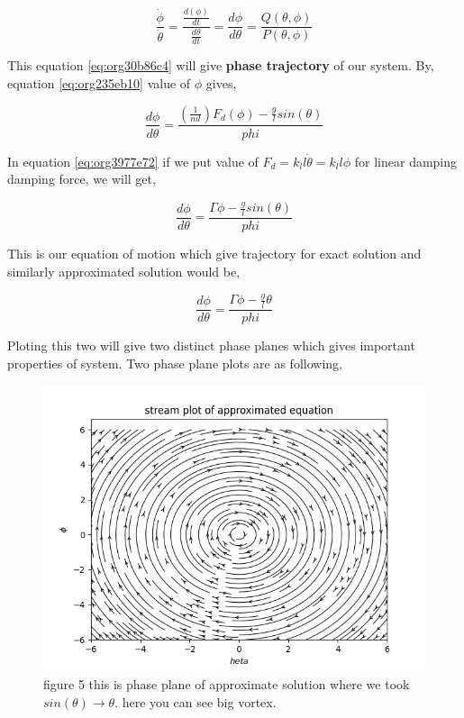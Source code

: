\documentclass[11pt,a4paper]{article}
\begin{document}
\begin{equation}
\label{eq:org30b86c4}
\frac{\dot{\phi}}{\dot{\theta}}= \frac{\frac{d(\phi)}{dt}}{\frac{d{\theta}}{dt}} = \frac{d\phi}{d\theta}= \frac{Q(\theta,\phi)}{P(\theta,\phi)}
\end{equation}

This equation \ref{eq:org30b86c4} will give \textbf{phase trajectory} of our system. By, equation \ref{eq:org235eb10} value of \(\phi\) gives,

\begin{equation}
\label{eq:org3977e72}
\frac{d\phi}{d\theta}=\frac{(\frac{1}{ml})F_{d}(\phi)-\frac{g}{l}sin(\theta)}{phi}
\end{equation}

In equation \ref{eq:org3977e72} if we put value of \(F_{d} = k_{l}l\dot{\theta} = k_{l}l\phi\) for linear damping damping force, we will get,

\begin{equation}
\label{eq:orgf0d9fc2}
\frac{d\phi}{d\theta}=\frac{\Gamma\phi-\frac{g}{l}sin(\theta)}{phi}
\end{equation}

This is our equation of motion which give trajectory for exact solution and similarly approximated solution would be,

\begin{equation}
\label{eq:orgb4885f9}
\frac{d\phi}{d\theta}=\frac{\Gamma\phi-\frac{g}{l}\theta}{phi}
\end{equation}

Ploting this two will give two distinct phase planes which gives important properties of system. Two phase plane plots are as following, 


\begin{figure}[htbp]
\centering
\includegraphics[width=0.8 \textwidth]{approlstr.png}
\caption{\label{fig:orgabb9853}figure 5 this is phase plane of approximate solution where we took \(sin(\theta) \to \theta\). here you can see big vortex.}
\end{figure}
\end{document}
